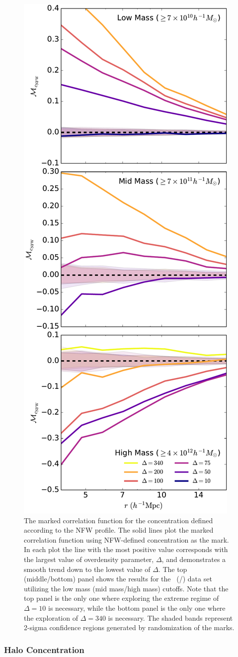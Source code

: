 \documentclass[usenatbib]{mnras}
\begin{document}
\begin{figure}
	\centering
	\includegraphics[width=.4\textwidth]{all_mcf_cNFW.pdf}
	\caption{
The marked correlation function for the concentration defined according to the 
NFW profile. The solid lines plot the marked correlation function using NFW-defined concentration as the mark. In each plot the line with the most 
positive value corresponds with the largest value of overdensity parameter, 
$\Delta$, and demonstrates a smooth trend down to the lowest value of 
$\Delta$. The top (middle/bottom) panel shows the results for the
\simA \ (\simB /\simC) data set utilizing the low mass (mid mass/high mass) cutoffs. Note
that the top panel is the only one where exploring the extreme regime of $\Delta = 10$ is
necessary, while the bottom panel is the only one where the exploration of $\Delta = 340$
is necessary. The shaded bands represent 2-sigma confidence regions generated by randomization of the marks.
}
	\label{fig:cc_mcf_cnfw}
\end{figure}


\subsubsection{Halo Concentration}
\end{document}
